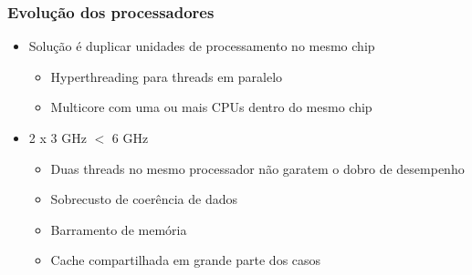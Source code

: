 \documentclass[xcolor={usenames,dvipsnames},12pt,presentation,aspectratio=169]{beamer}
\begin{document}
\begin{frame}
  \frametitle{Evolução dos processadores}
    \begin{itemize}
      \item Solução é duplicar unidades de processamento no mesmo chip
      \begin{itemize}
        \item Hyperthreading para threads em paralelo
        \item Multicore com uma ou mais CPUs dentro do mesmo chip
      \end{itemize}
      \item 2 x 3 GHz $<$ 6 GHz
      \begin{itemize}
        \item Duas threads no mesmo processador não garatem o dobro de desempenho 
        \item Sobrecusto de coerência de dados
        \item Barramento de memória
        \item Cache compartilhada em grande parte dos casos
      \end{itemize}
    \end{itemize}
  \begin{center}
  \end{center}
\end{frame}
\end{document}
